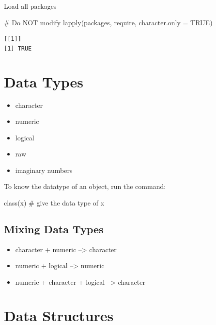 \documentclass[
  letterpaper,
  DIV=11,
  numbers=noendperiod]{scrreprt}
\newenvironment{Shaded}{\begin{snugshade}}{\end{snugshade}}
\newcommand{\AttributeTok}[1]{\textcolor[rgb]{0.40,0.45,0.13}{#1}}
\newcommand{\CommentTok}[1]{\textcolor[rgb]{0.37,0.37,0.37}{#1}}
\newcommand{\ConstantTok}[1]{\textcolor[rgb]{0.56,0.35,0.01}{#1}}
\newcommand{\FunctionTok}[1]{\textcolor[rgb]{0.28,0.35,0.67}{#1}}
\newcommand{\NormalTok}[1]{\textcolor[rgb]{0.00,0.23,0.31}{#1}}
\providecommand{\tightlist}{%
  \setlength{\itemsep}{0pt}\setlength{\parskip}{0pt}}\usepackage{longtable,booktabs,array}
\begin{document}
Load all packages

\begin{Shaded}
\begin{Highlighting}[]
\CommentTok{\# Do NOT modify}
\FunctionTok{lapply}\NormalTok{(packages, require, }\AttributeTok{character.only =} \ConstantTok{TRUE}\NormalTok{)}
\end{Highlighting}
\end{Shaded}

\begin{verbatim}
[[1]]
[1] TRUE
\end{verbatim}

\section{Data Types}\label{data-types}

\begin{itemize}
\tightlist
\item
  character
\item
  numeric
\item
  logical
\item
  raw
\item
  imaginary numbers
\end{itemize}

To know the datatype of an object, run the command:

\begin{Shaded}
\begin{Highlighting}[]
\FunctionTok{class}\NormalTok{(x) }\CommentTok{\# give the data type of x}
\end{Highlighting}
\end{Shaded}

\subsection{Mixing Data Types}\label{mixing-data-types}

\begin{itemize}
\tightlist
\item
  character + numeric --\textgreater{} character
\item
  numeric + logical --\textgreater{} numeric
\item
  numeric + character + logical --\textgreater{} character
\end{itemize}

\section{Data Structures}\label{data-structures}
\end{document}
